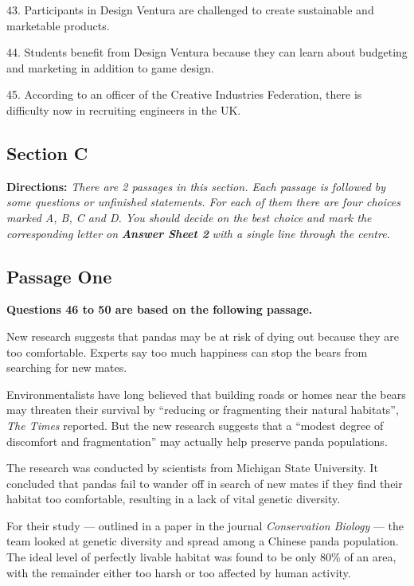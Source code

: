 \documentclass[UTF8,11pt]{ctexart}
\begin{document}
43. Participants in Design Ventura are challenged to create sustainable and marketable products.


44. Students benefit from Design Ventura because they can learn about budgeting and marketing in addition to game design.


45. According to an officer of the Creative Industries Federation, there is difficulty now in recruiting engineers in the UK.


\subsection*{\textbf{Section C}}


\textbf{Directions: }\textit{There are 2 passages in this section. Each passage is followed by some questions or unfinished} \textit{statements. For each of them there are four choices marked A, B, C and D. You should decide on the best choice} \textit{and mark the corresponding letter on }\textbf{\textit{Answer Sheet 2}}\textit{ with a single line through the centre.}


\subsection*{\textbf{Passage One}}


\textbf{Questions 46 to 50 are based on the following passage.}


New research suggests that pandas may be at risk of dying out because they are too comfortable. Experts say too much happiness can stop the bears from searching for new mates.


Environmentalists have long believed that building roads or homes near the bears may threaten their survival by “reducing or fragmenting their natural habitats”, \textit{The Times} reported. But the new research suggests that a “modest degree of discomfort and fragmentation” may actually help preserve panda populations.


The research was conducted by scientists from Michigan State University. It concluded that pandas fail to wander off in search of new mates if they find their habitat too comfortable, resulting in a lack of vital genetic diversity.


For their study — outlined in a paper in the journal \textit{Conservation Biology} — the team looked at genetic diversity and spread among a Chinese panda population. The ideal level of perfectly livable habitat was found to be only 80\% of an area, with the remainder either too harsh or too affected by human activity.
\end{document}
